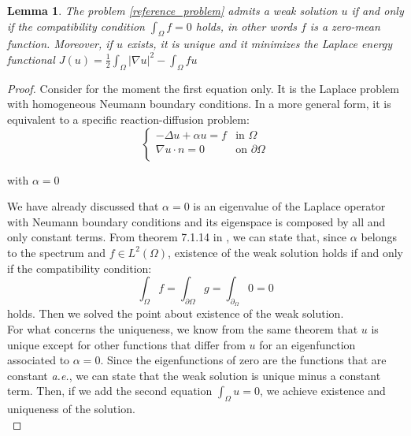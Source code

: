 \documentclass[a4paper,11pt]{article}
\newtheorem{lemma}{Lemma}
\begin{document}
\begin{lemma}
	The problem \ref{reference_problem} admits a weak solution $u$ if and only if the compatibility condition $\int_{\Omega} f = 0$ holds, in other words $f$ is a zero-mean function. Moreover, if $u$ exists, it is unique and it minimizes the Laplace energy functional $J(u) = \frac{1}{2}\int_{\Omega} |\nabla u |^2 - \int_{\Omega}fu$
\end{lemma} \vspace{1mm}
\begin{proof}
	Consider for the moment the first equation only. It is the Laplace problem with homogeneous Neumann boundary conditions. In a more general form, it is equivalent to a specific reaction-diffusion problem:
	\begin{equation*}
	\begin{cases}
	-\Delta{u} + \alpha u =f & \text{in } \Omega\\
	\nabla u \cdot n = 0 & \text{on } \partial \Omega \\
	\end{cases}
	\end{equation*}
	\begin{center}
		with $\alpha = 0$
	\end{center}
     We have already discussed that $\alpha=0$ is an eigenvalue of the Laplace operator with Neumann boundary conditions and its eigenspace is composed by all and only constant terms. From theorem 7.1.14 in \cite{gazzola}, we can state that, since $\alpha$ belongs to the spectrum and $f\in L^2(\Omega)$, existence of the weak solution holds if and only if the compatibility condition:
     \begin{equation*}
     \int_{\Omega}f = \int_{\partial \Omega} g = \int_{\partial_\Omega} 0 = 0 
     \end{equation*}
     holds. Then we solved the point about existence of the weak solution. \\
     
     \noindent For what concerns the uniqueness, we know from the same theorem that $u$ is unique except for other functions that differ from $u$ for an eigenfunction associated to $\alpha=0$. Since the eigenfunctions of zero are the functions that are constant \emph{a.e.}, we can state that the weak solution is unique minus a constant term. Then, if we add the second equation $\int_{\Omega}u = 0$, we achieve existence and uniqueness of the solution. \\
     

\end{proof}
\end{document}
